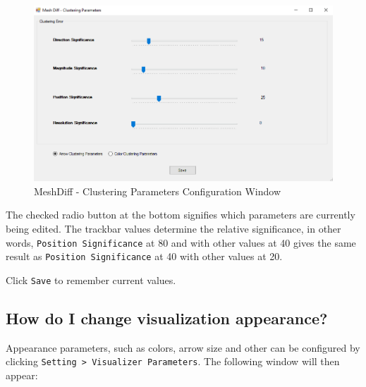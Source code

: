 \begin{figure}[h]
\centering
\includegraphics[width=1\textwidth]{./img/meshdiff-clustering_parameters.PNG}
\caption[MeshDiff - Clustering Parameters]{MeshDiff - Clustering Parameters Configuration Window}
\label{fig:meshdiff-clustering_parameters_window}
\end{figure}

The checked radio button at the bottom signifies which parameters are currently being edited. The trackbar values determine the relative significance, in other words, \verb+Position Significance+ at 80 and with other values at 40 gives the same result as \verb+Position Significance+ at 40 with other values at 20.

Click \verb+Save+ to remember current values.

\subsection{How do I change visualization appearance?}
\label{attch:user_doc_vis_params}

Appearance parameters, such as colors, arrow size and other can be configured by clicking \verb+Setting > Visualizer Parameters+. The following window will then appear:

